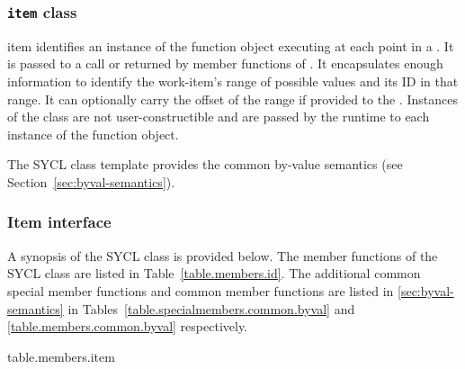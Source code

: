 \subsubsection{\texttt{item} class}
\label{subsec:item.class}

\gls{item} identifies an instance of the function object
executing at each point in a . It is passed to a
 call or returned by member functions of .
It encapsulates enough information to identify the work-item's range
of possible values and its ID in that range. It can optionally carry the offset of the
range if provided to the .
Instances of the  class are
not user-constructible and are passed by the runtime to each instance
of the function object.

The SYCL  class template provides the common by-value semantics
(see Section~\ref{sec:byval-semantics}).

\subsubsection{Item interface}

A synopsis of the SYCL  class is provided below. The member functions of the SYCL  class are listed in Table~\ref{table.members.id}. The additional common special member functions and common member functions are listed in \ref{sec:byval-semantics} in Tables~\ref{table.specialmembers.common.byval} and \ref{table.members.common.byval} respectively.



{table.members.item}

